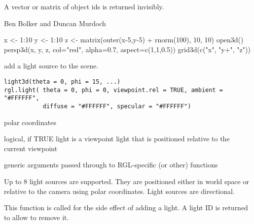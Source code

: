 \documentclass{article}
\begin{document}
\begin{Value}
A vector or matrix of object ids is returned invisibly.
\end{Value}
\begin{Author}\relax
Ben Bolker and Duncan Murdoch
\end{Author}
\begin{SeeAlso}\relax
{}
\end{SeeAlso}
\begin{Examples}
\begin{ExampleCode}
x <- 1:10
y <- 1:10
z <- matrix(outer(x-5,y-5) + rnorm(100), 10, 10)
open3d()
persp3d(x, y, z, col="red", alpha=0.7, aspect=c(1,1,0.5))
grid3d(c("x", "y+", "z"))
\end{ExampleCode}
\end{Examples}

\begin{Description}\relax
add a light source to the scene.
\end{Description}
\begin{Usage}
\begin{verbatim}
light3d(theta = 0, phi = 15, ...)
rgl.light( theta = 0, phi = 0, viewpoint.rel = TRUE, ambient = "#FFFFFF", 
           diffuse = "#FFFFFF", specular = "#FFFFFF")
\end{verbatim}
\end{Usage}
\begin{Arguments}
\begin{ldescription}
\item[\code{theta, phi}] polar coordinates
\item[\code{viewpoint.rel}] logical, if TRUE light is a viewpoint light that is positioned relative to the current viewpoint
\item[\code{ambient, diffuse, specular }] 
\item[\code{...}] generic arguments passed through to RGL-specific (or other) functions
\end{ldescription}
\end{Arguments}
\begin{Details}\relax
Up to 8 light sources are supported. They are positioned either in world space
or relative to the camera using polar coordinates. Light sources are directional.
\end{Details}
\begin{Value}
This function is called for the side effect of adding a light.  A light ID is
returned to allow  to remove it.
\end{Value}
\begin{SeeAlso}\relax
{}
\end{SeeAlso}
\end{document}
